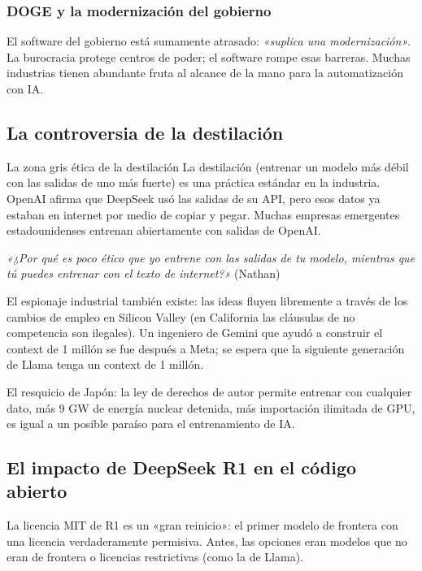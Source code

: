 \documentclass[a4paper]{article}
\begin{document}
\subsubsection{DOGE y la modernización del gobierno}

El software del gobierno está sumamente atrasado: \textit{«suplica una modernización»}. La burocracia protege centros de poder; el software rompe esas barreras. Muchas industrias tienen abundante fruta al alcance de la mano para la automatización con IA.

\subsection{La controversia de la destilación}

\begin{knowledgebox}{La zona gris ética de la destilación}
La destilación (entrenar un modelo más débil con las salidas de uno más fuerte) es una práctica estándar en la industria. OpenAI afirma que DeepSeek usó las salidas de su API, pero esos datos ya estaban en internet por medio de copiar y pegar. Muchas empresas emergentes estadounidenses entrenan abiertamente con salidas de OpenAI.

\textit{«¿Por qué es poco ético que yo entrene con las salidas de tu modelo, mientras que tú puedes entrenar con el texto de internet?»} (Nathan)

El espionaje industrial también existe: las ideas fluyen libremente a través de los cambios de empleo en Silicon Valley (en California las cláusulas de no competencia son ilegales). Un ingeniero de Gemini que ayudó a construir el context de 1 millón se fue después a Meta; se espera que la siguiente generación de Llama tenga un context de 1 millón.

El resquicio de Japón: la ley de derechos de autor permite entrenar con cualquier dato, más 9 GW de energía nuclear detenida, más importación ilimitada de GPU, es igual a un posible paraíso para el entrenamiento de IA.
\end{knowledgebox}

\subsection{El impacto de DeepSeek R1 en el código abierto}

La licencia MIT de R1 es un «gran reinicio»: el primer modelo de frontera con una licencia verdaderamente permisiva. Antes, las opciones eran modelos que no eran de frontera o licencias restrictivas (como la de Llama).
\end{document}

